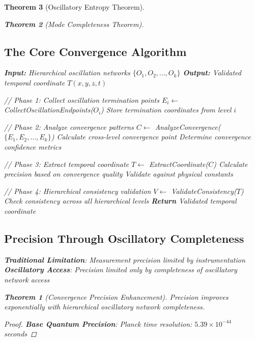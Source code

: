 \documentclass[12pt,a4paper]{article}
\newtheorem{theorem}{Theorem}[section]
\begin{document}
\begin{theorem}[Oscillatory Entropy Theorem]
\begin{theorem}[Mode Completeness Theorem]
\begin{enumerate}
\subsection{The Core Convergence Algorithm}

\begin{algorithm}
\caption{Oscillation Convergence Temporal Extraction}
\begin{algorithmic}
\State \textbf{Input:} Hierarchical oscillation networks $\{O_1, O_2, ..., O_k\}$
\State \textbf{Output:} Validated temporal coordinate $T(x,y,z,t)$

\State // Phase 1: Collect oscillation termination points
    \State $E_i \leftarrow$ CollectOscillationEndpoints($O_i$)
    \State Store termination coordinates from level $i$
\EndFor

\State // Phase 2: Analyze convergence patterns
\State $C \leftarrow$ AnalyzeConvergence($\{E_1, E_2, ..., E_k\}$)
\State Calculate cross-level convergence point
\State Determine convergence confidence metrics

\State // Phase 3: Extract temporal coordinate
\State $T \leftarrow$ ExtractCoordinate($C$)
\State Calculate precision based on convergence quality
\State Validate against physical constants

\State // Phase 4: Hierarchical consistency validation
\State $V \leftarrow$ ValidateConsistency($T$)
\State Check consistency across all hierarchical levels
\State \textbf{Return} Validated temporal coordinate
\end{algorithmic}
\end{algorithm}

\subsection{Precision Through Oscillatory Completeness}

\textbf{Traditional Limitation}: Measurement precision limited by instrumentation
\textbf{Oscillatory Access}: Precision limited only by completeness of oscillatory network access

\begin{theorem}[Convergence Precision Enhancement]
Precision improves exponentially with hierarchical oscillatory network completeness.
\end{theorem}

\begin{proof}
\textbf{Base Quantum Precision}: Planck time resolution: $5.39 \times 10^{-44}$ seconds


\end{proof}
\end{enumerate}
\end{theorem}
\end{theorem}
\end{document}

